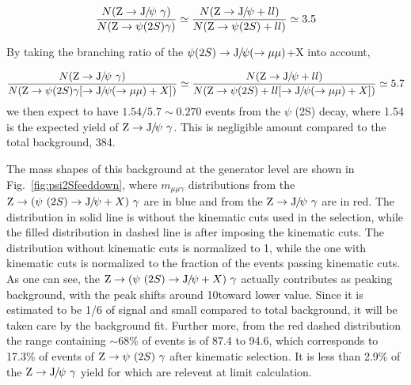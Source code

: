 	\begin{equation}
	\frac{N(\cPZ\to\JPsi\ \gamma)}{N(\cPZ\to\psi (2S)\gamma)}\simeq\frac{N(\Z\to\JPsi +ll)}{N(\Z\to\psi (2S)+ll)}\simeq 3.5
	\end{equation}
	
	By taking the branching ratio of the $\psi (2S)\to{\mathrm{J}\hspace{-.08em}/\hspace{-.14em}\psi}(\to\mu\mu)$+X into account,
	
	\begin{equation}
	\frac{N(\cPZ\to\JPsi\ \gamma)}{N(\Z\to\psi (2S)\gamma[\to\JPsi(\to\mu\mu)+X])}\simeq\frac{N(\Z\to\JPsi +ll)}{N(\Z\to\psi (2S)+ll[\to\JPsi(\to\mu\mu)+X])}\simeq 5.7
	\end{equation}
	we then expect to have $1.54/5.7\sim 0.270$ events from the $\psi$ (2S) decay, where 1.54 is the expected yield of $\mathrm{Z}\to{\mathrm{J}\hspace{-.08em}/\hspace{-.14em}\psi}\ \gamma$. This is negligible amount compared to the total background, 384. 
	
	The mass shapes of this background at the generator level are shown in Fig.~\ref{fig:psi2Sfeeddown}, where $m_{\mu\mu\gamma}$ distributions from the $\cPZ\to(\psi\ (2S)\to\JPsi +X)\ \gamma$ are in blue and from the $\mathrm{Z}\to{\mathrm{J}\hspace{-.08em}/\hspace{-.14em}\psi}\ \gamma$ are in red. The distribution in solid line is without the kinematic cuts used in the selection, while the filled distribution in dashed line is after imposing the kinematic cuts. The distribution without kinematic cuts is normalized to 1, while the one with kinematic cuts is normalized to the fraction of the events passing kinematic cuts. 
	As one can see, the $\cPZ\to(\psi\ (2S)\to\JPsi+X)\ \gamma$ actually contributes as peaking background, with the peak shifts around 10\GeV toward lower value. Since it is estimated to be 1/6 of signal and small compared to total background, it will be taken care by the background fit. Further more, from the red dashed distribution the range containing $\sim68\%$ of events is of 87.4 to 94.6\GeV, which corresponds to 17.3\% of events of $\mathrm{Z}\to\psi\ (2S)\ \gamma$ after kinematic selection. It is less than 2.9\% of the $\mathrm{Z}\to{\mathrm{J}\hspace{-.08em}/\hspace{-.14em}\psi}\ \gamma$ yield for which are relevent at limit calculation. 
	
